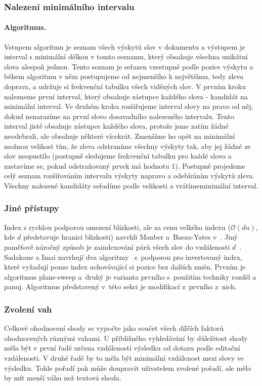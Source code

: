 \documentclass[11pt,letterpaper,oneside,openright]{book}
\begin{document}
\subsubsection{Nalezení minimálního intervalu} \label{sec:find_minimal_interval}
\paragraph{Algoritmus.} Vstupem algoritmu je seznam všech výskytů slov v
dokumentu a výstupem je interval s minimální délkou v tomto seznamu, který
obsahuje všechna unikátní slova alespoň jednou. Tento seznam je seřazen
vzestupně podle pozice výskytu a během algoritmu v něm postupujeme od
nejmenšího k největšímu, tedy zleva doprava, a udržuje si frekvenční tabulku
všech viděných slov.  V prvním kroku nalezneme první interval, který obsahuje
zástupce každého slova - kandidát na minimální interval. Ve druhém kroku
rozšiřujeme interval slovy na pravo od něj, dokud nenarazíme na první slovo
dosavadního nalezeného intervalu. Tento interval jistě obsahuje zástupce
každého slova, protože jsme zatím žádné neodebrali, ale obsahuje některé
vícekrát. Zmenšíme ho opět na minimální možnou velikost tím, že zleva
odstraníme všechny výskyty tak, aby jej žádné ze slov neopustilo (postupně
sledujeme frekvenční tabulku pro každé slovo a zastavíme se, pokud odstraňovaný
prvek má hodnotu 1). Postupně projedeme celý seznam rozšiřováním intervalu
výskyty napravo a odebíráním výskytů zleva. Všechny nalezené kandidáty seřadíme
podle velikosti a vrátímeminimální interval.

\subsubsection{Jiné přístupy}
Index s rychlou podporou omezení blízkosti, ale za cenu velkého indexu
($\mathcal{O}(dn)$, kde $d$ představuje hranici blízkosti) navrhli Manber
a~Baeza-Yates v~\cite{MANBER1991133}. Jiný paměťově náročný způsob je
zaindexování párů všech slov do vzdálenosti $d$~\cite{Aref95}. Sadakane a Imai
navrhují dva algoritmy~\cite{Sadakane99textretrieval} s~podporou pro
invertovaný index, které vyžadují pouze index uchovávající si pozice bez
dalších změn. Prvním je algoritmus plane-sweep a~druhý je varianta prvního
s~použitím techniky rozděl a panuj. Algoritmus představený v~této sekci je
modifikací z~prvního z~nich.

\subsubsection{Zvolení vah}
Celkové ohodnocení shody se vypočte jako součet všech dílčích faktorů
ohodnocených různými vahami. U přibližného vyhledávání by důležitost shody měla
být v první řadě určena vzdáleností výsledku od dotazu podle editační
vzdálenosti. V druhé řadě by to měla být minimální vzdálenost mezi slovy ve
výsledku. Tohle pořadí pak může doupravit uživatelem zvolené pořadí, ale mělo
by mít menší váhu než textová shoda.
\end{document}
